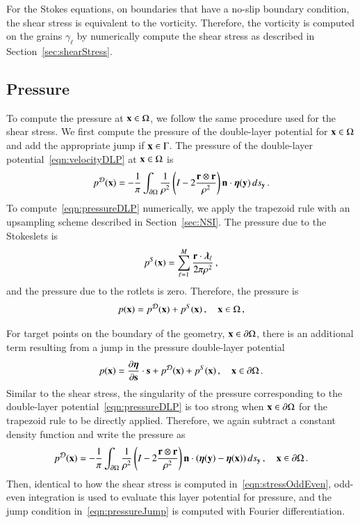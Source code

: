 \documentclass[preprint, 10pt]{elsarticle}
\begin{document}
For the Stokes equations, on boundaries that have a no-slip boundary condition, the shear stress is equivalent to the vorticity.  Therefore, the vorticity is computed on the grains $\gamma_\ell$ by numerically compute the shear stress as described in Section~\ref{sec:shearStress}.

\subsection{Pressure}
\label{sec:pressure}
To compute the pressure at ${\mathbf{x}} \in \Omega$, we follow the same procedure used for the shear stress.  We first compute the pressure of the double-layer potential for ${\mathbf{x}} \in \Omega$ and add the appropriate jump if ${\mathbf{x}} \in \Gamma$. The pressure of the double-layer potential~\eqref{eqn:velocityDLP} at ${\mathbf{x}} \in \Omega$ is
\begin{align}
  p^{{\mathcal{D}}}({\mathbf{x}}) = -\frac{1}{\pi}\int_{{\partial}\Omega} \frac{1}{\rho^2}
    \left(I - 2 \frac{{\mathbf{r}} \otimes {\mathbf{r}}}{\rho^2}\right) 
    {\mathbf{n}} \cdot {\boldsymbol\eta}({\mathbf{y}}) \,ds_{\mathbf{y}} \, .
    \label{eqn:pressureDLP}
\end{align}
To compute~\eqref{eqn:pressureDLP} numerically, we apply the trapezoid rule with an upsampling scheme described in Section~\ref{sec:NSI}.  The pressure due to the Stokeslets is
\begin{align}
  p^S({\mathbf{x}}) = \sum_{\ell=1}^{M}\frac{{\mathbf{r}} \cdot
  {\boldsymbol\lambda}_\ell}{2\pi\rho^2}\, ,
\end{align}
and the pressure due to the rotlets is zero.  Therefore, the pressure is
\begin{align}
  p({\mathbf{x}}) = p^{{\mathcal{D}}}({\mathbf{x}}) + p^{S}({\mathbf{x}})\, , \quad {\mathbf{x}} \in \Omega \, ,
\end{align}

For target points on the boundary of the geometry, ${\mathbf{x}} \in {\partial} \Omega$, there is an additional term resulting from a jump in the pressure double-layer potential~\cite{poz1992}
\begin{align}
  p({\mathbf{x}})= \frac{\partial {\boldsymbol\eta}}{\partial {\mathbf{s}}} \cdot {\mathbf{s}} + p^{{\mathcal{D}}}({\mathbf{x}}) + 
              p^{S}({\mathbf{x}})\, , \quad {\mathbf{x}} \in {\partial}\Omega \, .
  \label{eqn:pressureJump}
\end{align}
Similar to the shear stress, the singularity of the pressure corresponding to the double-layer potential~\eqref{eqn:pressureDLP} is too strong when ${\mathbf{x}} \in {\partial}\Omega$ for the trapezoid rule to be directly applied.  Therefore, we again subtract a constant density function and write the pressure as
\begin{equation}
\begin{aligned}
  p^{\mathcal{D}}({\mathbf{x}}) = -\frac{1}{\pi}\int_{{\partial}\Omega} \frac{1}{\rho^2}
    \left(I - 2 \frac{{\mathbf{r}} \otimes {\mathbf{r}}}{\rho^2}\right) 
    {\mathbf{n}} \cdot ({\boldsymbol\eta}({\mathbf{y}}) - {\boldsymbol\eta}({\mathbf{x}})) \,ds_{\mathbf{y}}\, , 
    \quad {\mathbf{x}} \in {\partial}\Omega\, .
\end{aligned}
\end{equation}
Then, identical to how the shear stress is computed in~\eqref{eqn:stressOddEven}, odd-even integration is used to evaluate this layer potential for pressure, and the jump condition in~\eqref{eqn:pressureJump} is computed with Fourier differentiation.  
\end{document}
